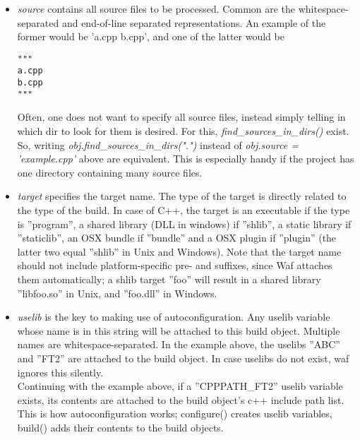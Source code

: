\documentclass[a4paper,10pt]{article}
\begin{document}
\begin{itemize}

\item \emph{source} contains all source files to be processed. Common are the whitespace-separated and end-of-line separated representations. An example of the former would be 'a.cpp b.cpp', and one of the latter would be
\\
\begin{verbatim}
"""
a.cpp
b.cpp
"""
\end{verbatim}

Often, one does not want to specify all source files, instead simply telling in which dir to look for them is desired. For this, \emph{find\_sources\_in\_dirs()} exist. So, writing \emph{obj.find\_sources\_in\_dirs(".")} instead of \emph{obj.source = 'example.cpp'} above are equivalent. This is especially handy if the project has one directory containing many source files.

\item \emph{target} specifies the target name. The type of the target is directly related to the type of the build. In case of C++, the target is an executable if the type is ''program'', a shared library (DLL in windows) if ''shlib'', a static library if ''staticlib'', an OSX bundle if ''bundle'' and a OSX plugin if ''plugin'' (the latter two equal ''shlib'' in Unix and Windows). Note that the target name should not include platform-specific pre- and suffixes, since Waf attaches them automatically; a shlib target ''foo'' will result in a shared library ''libfoo.so'' in Unix, and ''foo.dll'' in Windows.

\item \emph{uselib} is the key to making use of autoconfiguration. Any uselib variable whose name is in this string will be attached to this build object. Multiple names are whitespace-separated. In the example above, the uselibs ''ABC'' and ''FT2'' are attached to the build object. In case uselibs do not exist, waf ignores this silently.\\
Continuing with the example above, if a ''CPPPATH\_FT2'' uselib variable exists, its contents are attached to the build object's c++ include path list. This is how autoconfiguration works; configure() creates uselib variables, build() adds their contents to the build objects.

\end{itemize}
\end{document}
